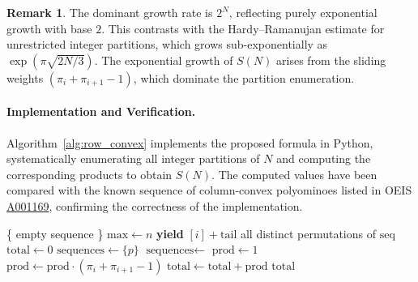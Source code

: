 \documentclass{article}
\theoremstyle{definition}
\newtheorem{remark}{Remark}[section]
\theoremstyle{plain}
\begin{document}
\begin{remark}
The dominant growth rate is $2^N$, reflecting purely exponential growth 
with base $2$. This contrasts with the Hardy--Ramanujan estimate for 
unrestricted integer partitions, which grows sub-exponentially as 
$\exp\!\left(\pi\sqrt{2N/3}\right)$. The exponential growth of $S(N)$ 
arises from the sliding weights $(\pi_i + \pi_{i+1}-1)$, which dominate 
the partition enumeration.
\end{remark}

\paragraph{Implementation and Verification.}
Algorithm~\ref{alg:row_convex} implements the proposed formula in Python, 
systematically enumerating all integer partitions of $N$ and computing the 
corresponding products to obtain $S(N)$. The computed values have been 
compared with the known sequence of column-convex polyominoes listed in 
OEIS \href{https://oeis.org/A001169}{A001169}, confirming the correctness 
of the implementation.

\begin{algorithm}[H]
\caption{Computation of $S(N)$ for Row-Convex Polyominoes}
\label{alg:row_convex}
\begin{algorithmic}[1]
     \State \Return \{ empty sequence \} \EndIf
        \State $\text{max} \gets n$
    \EndIf
            \State \textbf{yield} $[i] + \text{tail}$
        \EndFor
    \EndFor
\EndFunction
{}
    \State \Return all distinct permutations of $\text{seq}$
\EndFunction
{}
    \State $\text{total} \gets 0$
            \State $\text{sequences} \gets \{ p \}$
        \Else
            \State $\text{sequences} \gets$ 
        \EndIf
            \State $\text{prod} \gets 1$
                \State $\text{prod} \gets \text{prod} \cdot 
                (\pi_i + \pi_{i+1} - 1)$
            \EndFor
            \State $\text{total} \gets \text{total} + \text{prod}$
        \EndFor
    \EndFor
    \State \Return $\text{total}$
\EndFunction
\end{algorithmic}
\end{algorithm}
\end{document}
